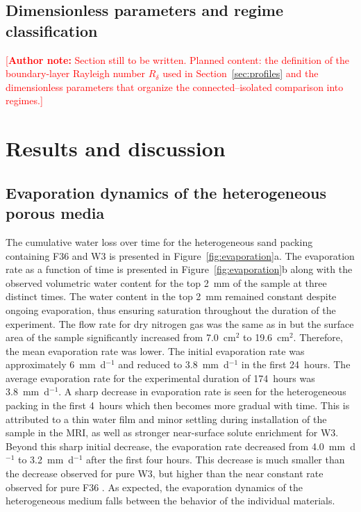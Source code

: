 \documentclass[final]{agujournal2019}
\newcommand{\authornote}[1]{%
  \par\noindent\textcolor{red}{\small[\textbf{Author note:} #1]}\par}
\begin{document}
\subsection{Dimensionless parameters and regime classification} \label{sec:regime}

\authornote{Section still to be written. Planned content: the definition of the
boundary-layer Rayleigh number $R_\delta$ used in Section~\ref{sec:profiles} and
the dimensionless parameters that organize the connected--isolated comparison
into regimes.}

\section{Results and discussion} \label{sec:results}

\subsection{Evaporation dynamics of the heterogeneous porous media}
\label{sec:evaporation}

The cumulative water loss over time for the heterogeneous sand packing
containing F36 and W3 is presented in Figure~\ref{fig:evaporation}a. The
evaporation rate as a function of time is presented in
Figure~\ref{fig:evaporation}b along with the observed volumetric water content
for the top 2~mm of the sample at three distinct times. The water content in the
top 2~mm remained constant despite ongoing evaporation, thus ensuring saturation
throughout the duration of the experiment. The flow rate for dry nitrogen gas was
the same as in  but the surface area of the sample
significantly increased from 7.0~cm$^2$ to 19.6~cm$^2$. Therefore, the mean
evaporation rate was lower. The initial evaporation rate was approximately
6~mm~d$^{-1}$ and reduced to 3.8~mm~d$^{-1}$ in the first 24~hours. The average
evaporation rate for the experimental duration of 174~hours was
3.8~mm~d$^{-1}$. A sharp decrease in evaporation rate is seen for the
heterogeneous packing in the first 4~hours which then becomes more gradual with
time. This is attributed to a thin water film and minor settling during
installation of the sample in the MRI, as well as stronger near-surface solute
enrichment for W3. Beyond this sharp initial decrease, the evaporation rate
decreased from 4.0~mm~d$^{-1}$ to 3.2~mm~d$^{-1}$ after the first four hours.
This decrease is much smaller than the decrease observed for pure W3, but higher
than the near constant rate observed for pure F36 \cite{chaudhry2026}. As
expected, the evaporation dynamics of the heterogeneous medium falls between the
behavior of the individual materials.
\end{document}
